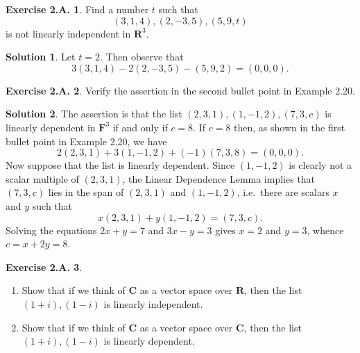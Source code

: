\documentclass[12pt]{article}
\theoremstyle{definition}
\theoremstyle{exercise}
\newtheorem{exercise}{Exercise 2.A.}
\theoremstyle{solution}
\newtheorem*{solution}{Solution}
\newcommand{\R}{\mathbf{R}}
\newcommand{\C}{\mathbf{C}}
\newcommand{\F}{\mathbf{F}}
\begin{document}
\begin{exercise}
\label{ex:3}
    Find a number \( t \) such that
    \[
        (3, 1, 4), (2, -3, 5), (5, 9, t)
    \]
    is not linearly independent in \( \R^3 \).
\end{exercise}

\begin{solution}
    Let \( t = 2 \). Then observe that
    \[
        3 (3, 1, 4) - 2(2, -3, 5) - (5, 9, 2) = (0, 0, 0).
    \]
\end{solution}

\begin{exercise}
\label{ex:4}
    Verify the assertion in the second bullet point in Example 2.20.
\end{exercise}

\begin{solution}
    The assertion is that the list \( (2, 3, 1), (1, -1, 2), (7, 3, c) \) is linearly dependent in \( \F^3 \) if and only if \( c = 8 \). If \( c = 8 \) then, as shown in the first bullet point in Example 2.20, we have
    \[
        2 (2, 3, 1) + 3 (1, -1, 2) + (-1) (7, 3, 8) = (0, 0, 0).
    \]
    Now suppose that the list is linearly dependent. Since \( (1, -1, 2) \) is clearly not a scalar multiple of \( (2, 3, 1) \), the Linear Dependence Lemma implies that \( (7, 3, c) \) lies in the span of \( (2, 3, 1) \) and \( (1, -1, 2) \), i.e.\ there are scalars \( x \) and \( y \) such that
    \[
        x (2, 3, 1) + y (1, -1, 2) = (7, 3, c).
    \]
    Solving the equations \( 2x + y = 7 \) and \( 3x - y = 3 \) gives \( x = 2 \) and \( y = 3 \), whence \( c = x + 2y = 8 \).
\end{solution}

\begin{exercise}
\label{ex:5}
    \begin{enumerate}
        \item Show that if we think of \( \C \) as a vector space over \( \R \), then the list \( (1 + i), (1 - i) \) is linearly independent.

        \item Show that if we think of \( \C \) as a vector space over \( \C \), then the list \( (1 + i), (1 - i) \) is linearly dependent.
    \end{enumerate}
\end{exercise}
\end{document}
